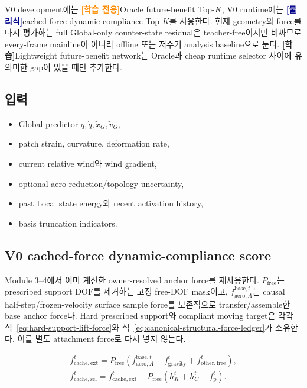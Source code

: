 \documentclass[11pt,a4paper]{article}
\newcommand{\physics}{\textcolor{darkblue}{\textbf{[물리식]}}}
\newcommand{\learned}{\textcolor{darkpurple}{\textbf{[학습]}}}
\newcommand{\trainonly}{\textcolor{darkorange}{\textbf{[학습 전용]}}}
\begin{document}
V0 development에는 \trainonly Oracle future-benefit Top-\(K\),
V0 runtime에는 \physics cached-force dynamic-compliance Top-\(K\)를 사용한다.
현재 geometry와 force를 다시 평가하는 full Global-only counter-state residual은
teacher-free이지만 비싸므로 every-frame mainline이 아니라 offline 또는 저주기 analysis baseline으로 둔다.
\learned Lightweight future-benefit network는 Oracle과 cheap runtime selector 사이에
유의미한 gap이 있을 때만 추가한다.

\subsection*{입력}

\begin{itemize}[leftmargin=1.5em]
  \item Global predictor \(q,\dot q,\widetilde x_G,\widetilde v_G\),
  \item patch strain, curvature, deformation rate,
  \item current relative wind와 wind gradient,
  \item optional aero-reduction/topology uncertainty,
  \item past Local state energy와 recent activation history,
  \item basis truncation indicators.
\end{itemize}

\subsection*{V0 cached-force dynamic-compliance score}

Module 3--4에서 이미 계산한 owner-resolved anchor force를 재사용한다.
\(P_{\mathrm{free}}\)는 prescribed support DOF를 제거하는 고정 free-DOF mask이고,
\(f_{\mathrm{aero},A}^{\mathrm{base},t}\)는 causal half-step/frozen-velocity surface sample force를
보존적으로 transfer/assemble한 base anchor force다.
Hard prescribed support와 compliant moving target은 각각
식~\eqref{eq:hard-support-lift-force}와 식~\eqref{eq:canonical-structural-force-ledger}가 소유한다.
이를 별도 attachment force로 다시 넣지 않는다.

\begin{equation}
\begin{aligned}
  f_{\mathrm{cache,ext}}^t
  =P_{\mathrm{free}}
  \left(
    f_{\mathrm{aero},A}^{\mathrm{base},t}
    +f_{\mathrm{gravity}}^t+f_{\mathrm{other,free}}^t
  \right),\\
  f_{\mathrm{cache,sel}}^t
  =f_{\mathrm{cache,ext}}^t
  +P_{\mathrm{free}}(h_K^t+h_C^t+f_{\mathrm p}^t).
\end{aligned}
\end{equation}
\end{document}
